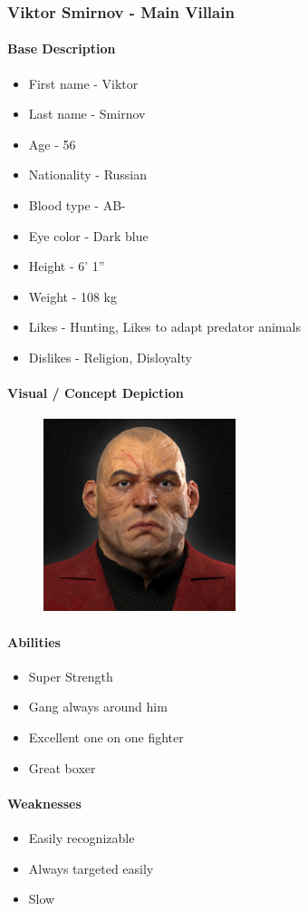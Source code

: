 \subsubsection{Viktor Smirnov - Main Villain}
	\paragraph{Base Description}\mbox{}
		\begin{itemize}
			\item First name - Viktor
			\item Last name - Smirnov
			\item Age - 56
			\item Nationality - Russian
			\item Blood type - AB-
			\item Eye color - Dark blue
			\item Height - 6’ 1”
			\item Weight - 108 kg
			\item Likes - Hunting, Likes to adapt predator animals
			\item Dislikes - Religion, Disloyalty
		\end{itemize}
	\paragraph{Visual / Concept Depiction}\mbox{}
		\begin{figure}[H]
			\centering
			\includegraphics[width=0.5\textwidth]{images/characters/viktor}
		\end{figure}
	\paragraph{Abilities}\mbox{}
		\begin{itemize}
			\item Super Strength
			\item Gang always around him
			\item Excellent one on one fighter
			\item Great boxer
		\end{itemize}
	\paragraph{Weaknesses}\mbox{}
		\begin{itemize}
			\item Easily recognizable
			\item Always targeted easily
			\item Slow
        \end{itemize}